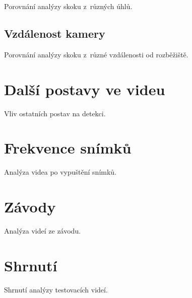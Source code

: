 Porovnání analýzy skoku z~různých úhlů.

\subsection{Vzdálenost kamery}

Porovnání analýzy skoku z~různé vzdálenosti od rozběžiště.

\section{Další postavy ve videu}

Vliv ostatních postav na detekci.

\section{Frekvence snímků}

Analýza videa po vypuštění snímků.

\section{Závody}

Analýza videí ze závodu.

\section{Shrnutí}

Shrnutí analýzy testovacích videí.

